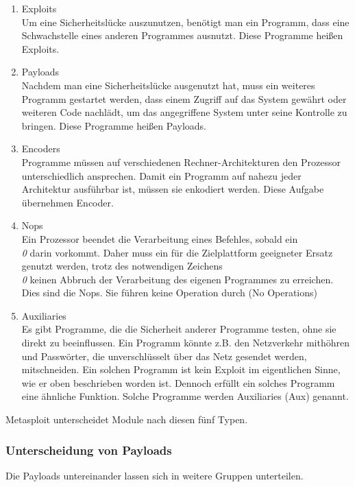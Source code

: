 \begin{enumerate}
  \item Exploits\\
    Um eine Sicherheitslücke auszunutzen, benötigt man ein Programm,
    dass eine Schwachstelle eines anderen Programmes ausnutzt. Diese
    Programme heißen Exploits. 
  \item Payloads\\
    Nachdem man eine Sicherheitslücke ausgenutzt hat, muss ein
    weiteres Programm gestartet werden, dass einem Zugriff auf das
    System gewährt oder weiteren Code nachlädt, um das angegriffene
    System unter seine Kontrolle zu bringen. Diese Programme heißen
    Payloads.  
  \item Encoders\\
    Programme müssen auf verschiedenen Rechner-Architekturen den
    Prozessor unterschiedlich ansprechen. Damit ein Programm auf
    nahezu jeder Architektur ausführbar ist, müssen sie enkodiert
    werden. Diese Aufgabe übernehmen Encoder.
  \item Nops\\
    Ein Prozessor beendet die Verarbeitung eines Befehles,
    sobald ein \emph{\\0} darin vorkommt. Daher muss ein
    für die Zielplattform geeigneter Ersatz genutzt werden, trotz des
    notwendigen Zeichens \emph{\\0} keinen Abbruch der Verarbeitung
    des eigenen Programmes zu erreichen. Dies sind die Nops. Sie
    führen keine Operation durch (No Operations) 
  \item Auxiliaries\\
    Es gibt Programme, die die Sicherheit anderer Programme testen,
    ohne sie direkt zu beeinflussen. Ein Programm könnte z.B. den
    Netzverkehr mithöhren und Passwörter, die unverschlüsselt über das
    Netz gesendet werden, mitschneiden. Ein solchen Programm ist kein
    Exploit im eigentlichen Sinne, wie er oben beschrieben worden
    ist. Dennoch erfüllt ein solches Programm eine ähnliche
    Funktion. Solche Programme werden Auxiliaries (Aux) genannt. 
\end{enumerate}

Metasploit unterscheidet Module nach diesen fünf Typen.

\subsubsection{Unterscheidung von Payloads}
\label{compositions:msf:payloads}
Die Payloads untereinander lassen sich in weitere Gruppen
unterteilen. 

